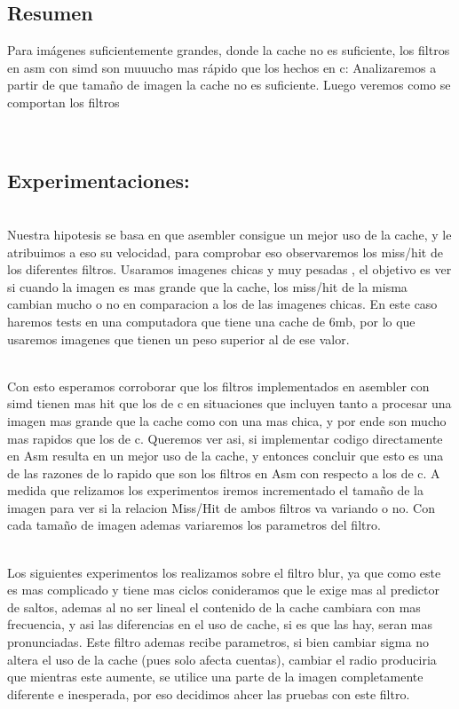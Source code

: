 \subsection{Resumen}

Para imágenes suficientemente grandes, donde la cache no es suficiente, los filtros en asm con simd son muuucho mas rápido que los hechos en c: Analizaremos a partir de que tamaño de imagen la cache no es suficiente. Luego veremos como se comportan los filtros

\\
\subsection{Experimentaciones:}\\

Nuestra hipotesis se basa en que asembler consigue un mejor uso de la cache, y le atribuimos a eso su velocidad, para comprobar eso observaremos los miss/hit de los diferentes filtros. Usaramos imagenes chicas y muy pesadas , el objetivo es ver si cuando la imagen es mas grande que la cache, los miss/hit de la misma cambian mucho o no en comparacion a los de las imagenes chicas. En este caso haremos tests en una computadora que tiene una cache de 6mb, por lo que usaremos imagenes que tienen un peso superior al de ese valor. 

\\
Con esto esperamos corroborar que los filtros implementados en asembler con simd tienen mas hit que los de c en situaciones que incluyen tanto a procesar una imagen mas grande que la cache como con una mas chica, y por ende son mucho mas rapidos que los de c. Queremos ver asi, si implementar codigo directamente en Asm resulta en un mejor uso de la cache, y entonces concluir que esto es una de las razones de lo rapido que son los filtros en Asm con respecto a los de c. A medida que relizamos los experimentos iremos incrementado el tamaño de la imagen para ver si la relacion Miss/Hit de ambos filtros va variando o no. Con cada tamaño de imagen ademas variaremos los parametros del filtro. 

\\
Los siguientes experimentos los realizamos sobre el filtro blur, ya que como este es mas complicado y tiene mas ciclos conideramos que le exige mas al predictor de saltos, ademas al no ser lineal el contenido de la cache cambiara con mas frecuencia, y asi las diferencias en el uso de cache, si es que las hay, seran mas pronunciadas. Este filtro ademas recibe parametros, si bien cambiar sigma no altera el uso de la cache (pues solo afecta cuentas), cambiar el radio produciria que mientras este aumente, se utilice una parte de la imagen completamente diferente e inesperada, por eso decidimos ahcer las pruebas con este filtro.

